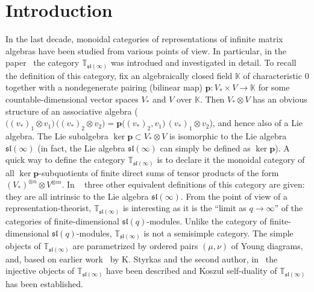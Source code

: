 \documentclass[11pt]{article}
\theoremstyle{plain}
\theoremstyle{nonumberplain}
\theoremstyle{plain}
\theoremstyle{nonumberplain}
\newcommand\fsl{\mathfrak{sl}}
\begin{document}


\section*{Introduction}\label{se.intro}

In the last decade, monoidal categories of representations of infinite
matrix algebras have been studied from various points of view.  In
particular, in the paper~\cite{DPS} the category
$\mathbb{T}_{\fsl(\infty)}$ was introdued and investigated in detail.
To recall the definition of this category, fix an algebraically closed
field $\mathbb{K}$ of characteristic $0$ together with a nondegenerate
pairing (bilinear map) $\mathbf{p}:V_*\times V\to\mathbb{K}$ for some
countable-dimensional vector spaces $V_*$ and $V$ over $\mathbb{K}$.
Then $V_*\otimes V$ has an obvious structure of an associative algebra
($\big(\left(v_*\right)_1\otimes
v_1\big)\,\big(\left(v_*\right)_2\otimes
v_2\big)=\mathbf{p}\big(\left(v_*\right)_2,v_1\big)\,\left(v_*\right)_1\otimes
v_2$), and hence also of a Lie algebra.  The Lie subalgebra
$\ker\mathbf{p}\subset V_*\otimes V$ is isomorphic to the Lie algebra
$\fsl(\infty)$ (in fact, the Lie algebra $\fsl(\infty)$ can simply be
defined as $\ker\mathbf{p}$).  A quick way to define the category
$\mathbb{T}_{\fsl(\infty)}$ is to declare it the monoidal category of
all $\ker\mathbf{p}$-subquotients of finite direct sums of tensor
products of the form
$\left(V_*\right)^{\otimes n}\otimes V^{\otimes m}$.  In ~\cite{DPS}
three other equivalent definitions of this category are given: they
are all intrinsic to the Lie algebra $\fsl(\infty)$.  From the point
of view of a representation-theorist, $\mathbb{T}_{\fsl(\infty)}$ is
interesting as it is the ``limit as $q\to\infty$'' of the categories
of finite-dimensional $\fsl(q)$-modules.  Unlike the category of
finite-dimensional $\fsl(q)$-modules, $\mathbb{T}_{\fsl(\infty)}$ is
not a semisimple category.  The simple objects of
$\mathbb{T}_{\fsl(\infty)}$ are parametrized by ordered pairs
$(\mu,\nu)$ of Young diagrams, and, based on earlier work~\cite{PS} by
K. Styrkas and the second author, in~\cite{DPS} the injective objects
of $\mathbb{T}_{\fsl(\infty)}$ have been described and
Koszul self-duality of $\mathbb{T}_{\fsl(\infty)}$ has been
established.
\end{document}
